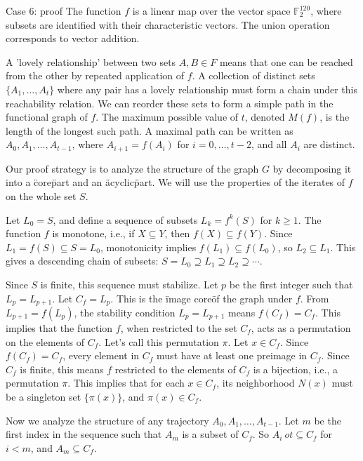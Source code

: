 \documentclass{article} %
\begin{document}
\begin{promptbox}{Case 6: proof}
  The function $f$ is a linear map over the vector space $\mathbb{F}_2^{120}$, where subsets are identified with their characteristic vectors. The union operation corresponds to vector addition.

A 'lovely relationship' between two sets $A, B \in F$ means that one can be reached from the other by repeated application of $f$. A collection of distinct sets $\{A_1, \dots, A_t\}$ where any pair has a lovely relationship must form a chain under this reachability relation. We can reorder these sets to form a simple path in the functional graph of $f$. The maximum possible value of $t$, denoted $M(f)$, is the length of the longest such path. A maximal path can be written as $A_0, A_1, \ldots, A_{t-1}$, where $A_{i+1} = f(A_i)$ for $i=0, \ldots, t-2$, and all $A_i$ are distinct.

Our proof strategy is to analyze the structure of the graph $G$ by decomposing it into a \"core\" part and an \"acyclic\" part. We will use the properties of the iterates of $f$ on the whole set $S$.

Let $L_0 = S$, and define a sequence of subsets $L_k = f^k(S)$ for $k \ge 1$.
The function $f$ is monotone, i.e., if $X \subseteq Y$, then $f(X) \subseteq f(Y)$.
Since $L_1 = f(S) \subseteq S = L_0$, monotonicity implies $f(L_1) \subseteq f(L_0)$, so $L_2 \subseteq L_1$.
This gives a descending chain of subsets:
$S = L_0 \supseteq L_1 \supseteq L_2 \supseteq \cdots$.

Since $S$ is finite, this sequence must stabilize. Let $p$ be the first integer such that $L_p = L_{p+1}$.
Let $C_f = L_p$. This is the \"image core\" of the graph under $f$.
From $L_{p+1} = f(L_p)$, the stability condition $L_p = L_{p+1}$ means $f(C_f) = C_f$.
This implies that the function $f$, when restricted to the set $C_f$, acts as a permutation on the elements of $C_f$. Let's call this permutation $\pi$.
Let $x \in C_f$. Since $f(C_f)=C_f$, every element in $C_f$ must have at least one preimage in $C_f$. Since $C_f$ is finite, this means $f$ restricted to the elements of $C_f$ is a bijection, i.e., a permutation $\pi$.
This implies that for each $x \in C_f$, its neighborhood $N(x)$ must be a singleton set $\{\pi(x)\}$, and $\pi(x) \in C_f$.

Now we analyze the structure of any trajectory $A_0, A_1, \ldots, A_{t-1}$.
Let $m$ be the first index in the sequence such that $A_m$ is a subset of $C_f$. So $A_i \
ot\subseteq C_f$ for $i<m$, and $A_m \subseteq C_f$.


\end{promptbox}
\end{document}

